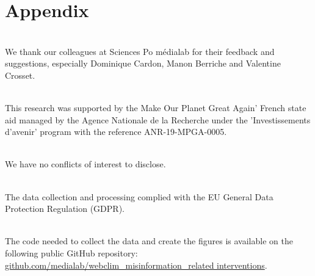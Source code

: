 \documentclass[Afour,sageh,times]{sagej}
\begin{document}




\theendnotes

{}




\section{Appendix}

 \\
We thank our colleagues at Sciences Po m\'{e}dialab for their feedback and suggestions, especially Dominique Cardon, Manon Berriche and Valentine Crosset. \bigskip

 \\
This research was supported by the Make Our Planet Great Again’ French state aid managed by the Agence Nationale de la Recherche under the ’Investissements d’avenir’ program with the reference ANR-19-MPGA-0005. \bigskip

 \\
We have no conflicts of interest to disclose. \bigskip

 \\
The data collection and processing complied with the EU General Data Protection Regulation (GDPR).\bigskip

 \\
The code needed to collect the data and create the figures is available on the following public GitHub repository: \href{github.com/medialab/webclim misinformation_related_interventions}{github.com/medialab/webclim\_misinformation\_related interventions}.
\end{document}
